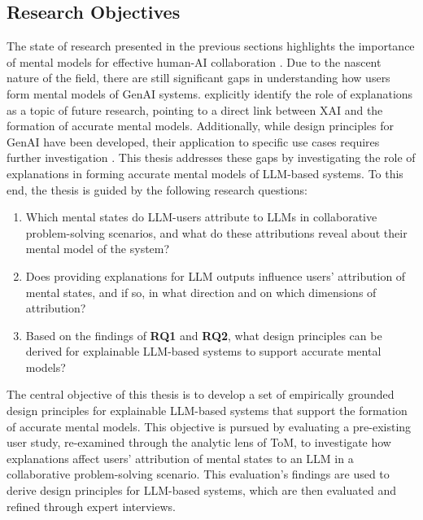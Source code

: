 \subsection{Research Objectives} \label{ssec:research-objectives}

The state of research presented in the previous sections highlights the importance of mental models for effective human-AI collaboration \parencite[cf.][]{Jussupow2021}. Due to the nascent nature of the field, there are still significant gaps in understanding how users form mental models of \ac{GenAI} systems. \textcite{Jussupow2021} explicitly identify the role of explanations as a topic of future research, pointing to a direct link between \ac{XAI} and the formation of accurate mental models. Additionally, while design principles for \ac{GenAI} have been developed, their application to specific use cases requires further investigation \parencite{Weisz2025}. This thesis addresses these gaps by investigating the role of explanations in forming accurate mental models of \ac{LLM}-based systems. To this end, the thesis is guided by the following research questions:

\begin{enumerate}[label=(\textbf{RQ\arabic*}),leftmargin=4em]
    \item Which mental states do \ac{LLM}-users attribute to \acp{LLM} in collaborative problem-solving scenarios, and what do these attributions reveal about their mental model of the system?
    \item Does providing explanations for \ac{LLM} outputs influence users' attribution of mental states, and if so, in what direction and on which dimensions of attribution?
    \item Based on the findings of \textbf{RQ1} and \textbf{RQ2}, what design principles can be derived for explainable \ac{LLM}-based systems to support accurate mental models?
\end{enumerate}

The central objective of this thesis is to develop a set of empirically grounded design principles for explainable \ac{LLM}-based systems that support the formation of accurate mental models. This objective is pursued by evaluating a pre-existing user study, re-examined through the analytic lens of \ac{ToM}, to investigate how explanations affect users' attribution of mental states to an \ac{LLM} in a collaborative problem-solving scenario. This evaluation's findings are used to derive design principles for \ac{LLM}-based systems, which are then evaluated and refined through expert interviews.
